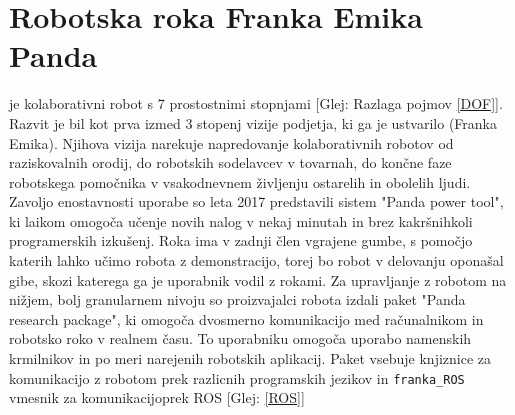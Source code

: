 \documentclass[a4paper,twoside,openright,12pt,slovene]{book}
\begin{document}
\section{Robotska roka Franka Emika Panda} je kolaborativni robot s 7 prostostnimi stopnjami [Glej: Razlaga pojmov \ref{DOF}]. Razvit je bil kot prva izmed 3 stopenj vizije podjetja, ki ga je ustvarilo (Franka Emika). Njihova vizija narekuje napredovanje kolaborativnih robotov od raziskovalnih orodij, do robotskih sodelavcev v tovarnah, do končne faze robotskega pomočnika v vsakodnevnem življenju ostarelih in obolelih ljudi. Zavoljo enostavnosti uporabe so leta 2017 predstavili sistem "Panda power tool", ki laikom omogoča učenje novih nalog v nekaj minutah in brez kakršnihkoli programerskih izkušenj. Roka ima v zadnji člen vgrajene gumbe, s pomočjo katerih lahko učimo robota z demonstracijo, torej bo robot v delovanju oponašal gibe, skozi katerega ga je uporabnik vodil z rokami. Za upravljanje z robotom na nižjem, bolj granularnem nivoju so proizvajalci robota izdali paket "Panda research package", ki omogoča dvosmerno komunikacijo med računalnikom in robotsko roko v realnem času. To uporabniku omogoča uporabo namenskih krmilnikov in po meri narejenih robotskih aplikacij. Paket vsebuje knjiznice za komunikacijo z robotom prek razlicnih programskih jezikov in \verb|franka_ROS| vmesnik za komunikacijoprek ROS [Glej: \ref{ROS}] \cite{panda_website}
\end{document}
